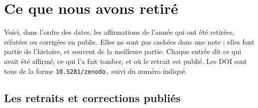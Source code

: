 \chapter{Ce que nous avons retiré}

Voici, dans l'ordre des dates, les affirmations de l'année qui ont été retirées, réfutées ou corrigées en public. Elles
ne sont pas cachées dans une note : elles font partie de l'histoire, et souvent de la meilleure partie. Chaque entrée
dit ce qui avait été affirmé, ce qui l'a fait tomber, et où le retrait est publié. Les DOI sont tous de la forme
\texttt{10.5281/zenodo.} suivi du numéro indiqué.

\section{Les retraits et corrections publiés}

